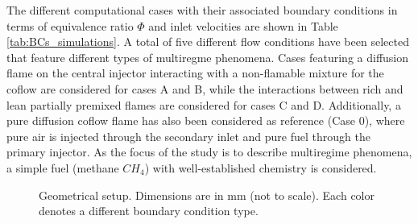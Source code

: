 \documentclass[preprint,12pt,authoryear]{elsarticle}
\begin{document}
{The different computational cases with their associated boundary conditions in terms of equivalence ratio $\Phi$ and inlet velocities are shown in Table \ref{tab:BCs_simulations}. A total of five different flow conditions have been selected that feature different types of multiregme phenomena. Cases featuring a  diffusion flame on the central injector interacting with a non-flamable mixture for the coflow are considered for cases A and B, while the interactions between rich and lean partially premixed flames are considered for cases C and D. Additionally, a pure diffusion coflow flame has also been considered as reference (Case 0), where pure air is injected through the secondary inlet and pure fuel through the primary injector. As the focus of the study is to describe multiregime phenomena, a simple fuel (methane $CH_4$) with well-established chemistry is considered.









\begin{figure}[h!]
	\centering
	\caption{Geometrical setup. Dimensions are in mm (not to scale). Each color denotes a different boundary condition type.}	
	\label{fig:simu_config}
\end{figure}

}
\end{document}
